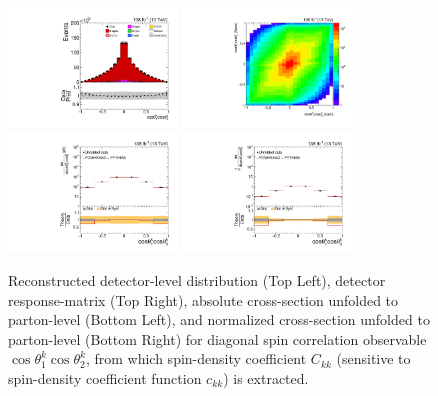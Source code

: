 \begin{figure}[htb]
\begin{center}
 \includegraphics[width=0.40\textwidth]{fig_fullRun2UL/controlplots/combined/Hyp_LLBarCkk.pdf}
 \includegraphics[width=0.40\textwidth]{fig_fullRun2UL/unfolding/combined/ResponseMatrix_c_kk.pdf} \\
 \includegraphics[width=0.40\textwidth]{fig_fullRun2UL/unfolding/combined/UnfoldedResults_c_kk.pdf}
 \includegraphics[width=0.40\textwidth]{fig_fullRun2UL/unfolding/combined/UnfoldedResultsNorm_c_kk.pdf} \\
\label{fig:c_kk}
\caption{Reconstructed detector-level distribution (Top Left), detector response-matrix (Top Right), absolute cross-section unfolded to parton-level (Bottom Left), and normalized cross-section unfolded to parton-level (Bottom Right) for diagonal spin correlation observable $\cos\theta_{1}^{k}\cos\theta_{2}^{k}$, from which spin-density coefficient $C_{kk}$ (sensitive to spin-density coefficient function $c_{k k}$) is extracted.}
\end{center}
\end{figure}
